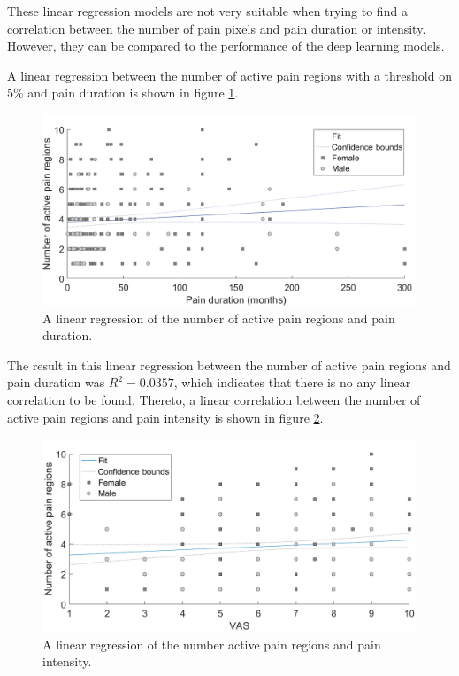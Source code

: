 \noindent
These linear regression models are not very suitable when trying to find a correlation between the number of pain pixels and pain duration or intensity. However, they can be compared to the performance of the deep learning models.




\noindent
A linear regression between the number of active pain regions with a threshold on 5\% and pain duration is shown in figure \ref{fig:regDuration}. \newline

\begin{figure} [H]
\centering
\includegraphics[width=1\textwidth]{figures/duraregion}
\caption{A linear regression of the number of active pain regions and pain duration.}
\label{fig:regDuration}
\end{figure}

\noindent
The result in this linear regression between the number of active pain regions and pain duration was $R^2=0.0357$, which indicates that there is no any linear correlation to be found.\newline
Thereto, a linear correlation between the number of active pain regions and pain intensity is shown in figure \ref{fig:regPain}.

\begin{figure} [H]
\centering
\includegraphics[width=1\textwidth]{figures/vasregion}
\caption{A linear regression of the number active pain regions and pain intensity.}
\label{fig:regPain}
\end{figure}

